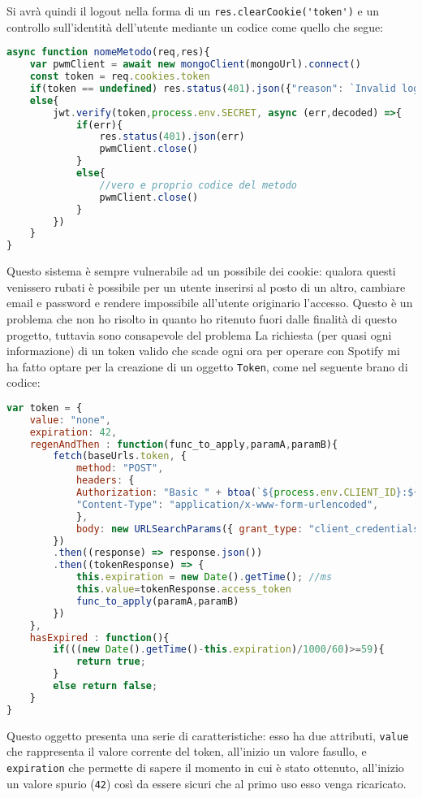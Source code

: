 Si avrà quindi il logout nella forma di un \verb|res.clearCookie('token')| e un controllo sull'identità dell'utente mediante un codice come quello che segue:
\begin{lstlisting}[language=JavaScript]
async function nomeMetodo(req,res){
    var pwmClient = await new mongoClient(mongoUrl).connect()
    const token = req.cookies.token
    if(token == undefined) res.status(401).json({"reason": `Invalid login`})
    else{
        jwt.verify(token,process.env.SECRET, async (err,decoded) =>{
            if(err){
                res.status(401).json(err)
                pwmClient.close()
            }
            else{
                //vero e proprio codice del metodo
                pwmClient.close()
            }
        })
    }
}
\end{lstlisting}
\alert{Questo sistema è sempre vulnerabile ad un possibile  dei cookie: qualora questi venissero rubati è possibile per un utente inserirsi al posto di un altro, cambiare email e password e rendere impossibile all'utente originario l'accesso. Questo è un problema che non ho risolto in quanto ho ritenuto fuori dalle finalità di questo progetto, tuttavia sono consapevole del problema}
La richiesta (per quasi ogni informazione) di un token valido che scade ogni ora per operare con Spotify mi ha fatto optare per la creazione di un oggetto \verb|Token|, come nel seguente brano di codice:
\begin{lstlisting}[language=JavaScript]
var token = {
    value: "none",
    expiration: 42,
    regenAndThen : function(func_to_apply,paramA,paramB){
        fetch(baseUrls.token, {
            method: "POST",
            headers: {
            Authorization: "Basic " + btoa(`${process.env.CLIENT_ID}:${process.env.CLIENT_SECRET}`),
            "Content-Type": "application/x-www-form-urlencoded",
            },
            body: new URLSearchParams({ grant_type: "client_credentials" }),
        })
        .then((response) => response.json())
        .then((tokenResponse) => {
            this.expiration = new Date().getTime(); //ms
            this.value=tokenResponse.access_token
            func_to_apply(paramA,paramB)
        })                   
    },
    hasExpired : function(){
        if(((new Date().getTime()-this.expiration)/1000/60)>=59){
            return true;
        }
        else return false;
    }
}
\end{lstlisting}
Questo oggetto presenta una serie di caratteristiche: esso ha due attributi, \verb|value| che rappresenta il valore corrente del token, all'inizio un valore fasullo, e \verb|expiration| che permette di sapere il momento in cui è stato ottenuto, all'inizio un valore spurio (\verb|42|) così da essere sicuri che al primo uso esso venga ricaricato.

